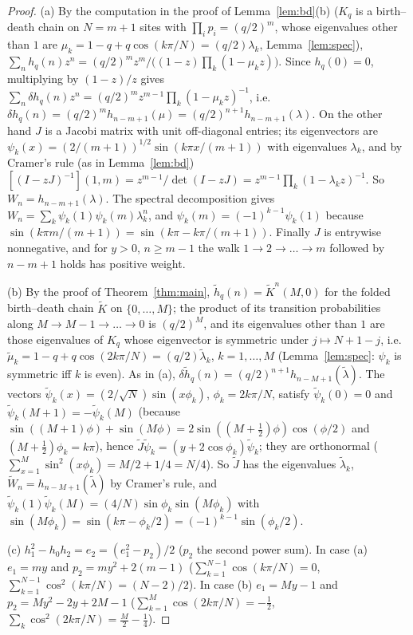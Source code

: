 \documentclass[11pt,a4paper]{article}
\theoremstyle{definition}
\begin{document}
\begin{proof}
(a) By the computation in the proof of Lemma~\ref{lem:bd}(b) ($K_q$ is a birth--death chain on $N=m+1$ sites with $\prod_ip_i=(q/2)^m$, whose eigenvalues other than $1$ are $\mu_k=1-q+q\cos(k\pi/N)=(q/2)\lambda_k$, Lemma~\ref{lem:spec}), $\sum_nh_q(n)z^n=(q/2)^mz^m/\bigl((1-z)\prod_k(1-\mu_kz)\bigr)$. Since $h_q(0)=0$, multiplying by $(1-z)/z$ gives $\sum_n\delta h_q(n)z^n=(q/2)^mz^{m-1}\prod_k(1-\mu_kz)^{-1}$, i.e.\ $\delta h_q(n)=(q/2)^mh_{n-m+1}(\mu)=(q/2)^{n+1}h_{n-m+1}(\lambda)$. On the other hand $J$ is a Jacobi matrix with unit off-diagonal entries; its eigenvectors are $\psi_k(x)=(2/(m+1))^{1/2}\sin(k\pi x/(m+1))$ with eigenvalues $\lambda_k$, and by Cramer's rule (as in Lemma~\ref{lem:bd}) $[(I-zJ)^{-1}](1,m)=z^{m-1}/\det(I-zJ)=z^{m-1}\prod_k(1-\lambda_kz)^{-1}$. So $W_n=h_{n-m+1}(\lambda)$. The spectral decomposition gives $W_n=\sum_k\psi_k(1)\psi_k(m)\lambda_k^n$, and $\psi_k(m)=(-1)^{k-1}\psi_k(1)$ because $\sin(k\pi m/(m+1))=\sin(k\pi-k\pi/(m+1))$. Finally $J$ is entrywise nonnegative, and for $y>0$, $n\ge m-1$ the walk $1\to2\to\dots\to m$ followed by $n-m+1$ holds has positive weight.

(b) By the proof of Theorem~\ref{thm:main}, $\tilde h_q(n)=\tilde K^n(M,0)$ for the folded birth--death chain $\tilde K$ on $\{0,\dots,M\}$; the product of its transition probabilities along $M\to M-1\to\dots\to0$ is $(q/2)^M$, and its eigenvalues other than $1$ are those eigenvalues of $K_q$ whose eigenvector is symmetric under $j\mapsto N+1-j$, i.e.\ $\tilde\mu_k=1-q+q\cos(2k\pi/N)=(q/2)\tilde\lambda_k$, $k=1,\dots,M$ (Lemma~\ref{lem:spec}: $\psi_k$ is symmetric iff $k$ is even). As in (a), $\delta\tilde h_q(n)=(q/2)^{n+1}h_{n-M+1}(\tilde\lambda)$. The vectors $\tilde\psi_k(x)=(2/\sqrt N)\sin(x\phi_k)$, $\phi_k=2k\pi/N$, satisfy $\tilde\psi_k(0)=0$ and $\tilde\psi_k(M+1)=-\tilde\psi_k(M)$ (because $\sin((M+1)\phi)+\sin(M\phi)=2\sin((M+\frac12)\phi)\cos(\phi/2)$ and $(M+\frac12)\phi_k=k\pi$), hence $\tilde J\tilde\psi_k=(y+2\cos\phi_k)\tilde\psi_k$; they are orthonormal ($\sum_{x=1}^M\sin^2(x\phi_k)=M/2+1/4=N/4$). So $\tilde J$ has the eigenvalues $\tilde\lambda_k$, $\tilde W_n=h_{n-M+1}(\tilde\lambda)$ by Cramer's rule, and $\tilde\psi_k(1)\tilde\psi_k(M)=(4/N)\sin\phi_k\sin(M\phi_k)$ with $\sin(M\phi_k)=\sin(k\pi-\phi_k/2)=(-1)^{k-1}\sin(\phi_k/2)$.

(c) $h_1^2-h_0h_2=e_2=(e_1^2-p_2)/2$ ($p_2$ the second power sum). In case (a) $e_1=my$ and $p_2=my^2+2(m-1)$ ($\sum_{k=1}^{N-1}\cos(k\pi/N)=0$, $\sum_{k=1}^{N-1}\cos^2(k\pi/N)=(N-2)/2$). In case (b) $e_1=My-1$ and $p_2=My^2-2y+2M-1$ ($\sum_{k=1}^M\cos(2k\pi/N)=-\frac12$, $\sum_k\cos^2(2k\pi/N)=\frac M2-\frac14$).
\end{proof}
\end{document}

